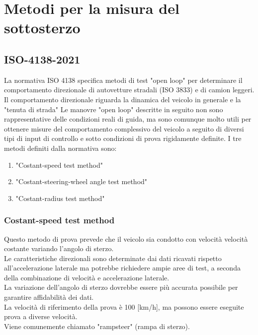\section{Metodi per la misura del sottosterzo}
\subsection{ISO-4138-2021}
La normativa ISO 4138 specifica metodi di test "open loop" per determinare il comportamento direzionale di autovetture stradali (ISO 3833) e di camion leggeri.\\
Il comportamento direzionale riguarda la dinamica del veicolo in generale e la "tenuta di strada"
Le manovre "open loop" descritte in seguito non sono rappresentative delle condizioni reali di guida, ma sono comunque molto utili per ottenere misure del comportamento complessivo del veicolo a seguito di diversi tipi di input di controllo e sotto condizioni di prova rigidamente definite.
I tre metodi definiti dalla normativa \cite{iso4138} sono:
\begin{enumerate}
    \item "Costant-speed test method"
    \item "Costant-steering-wheel angle test method"
    \item "Costant-radius test method"
\end{enumerate}
\subsubsection{Costant-speed test method}
Questo metodo di prova prevede che il veicolo sia condotto con velocità velocità costante variando l'angolo di sterzo.\\
Le caratteristiche direzionali sono determinate dai dati ricavati rispetto all'accelerazione laterale ma potrebbe
richiedere ampie aree di test, a seconda della combinazione di velocità e accelerazione laterale. \\
La variazione dell'angolo di sterzo dovrebbe essere più accurata possibile per garantire affidabilità dei dati.\\
La velocità di riferimento della prova è 100 [km/h], ma possono essere eseguite prova a diverse velocità.\\
Viene comunemente chiamato "rampsteer" (rampa di sterzo).\\
